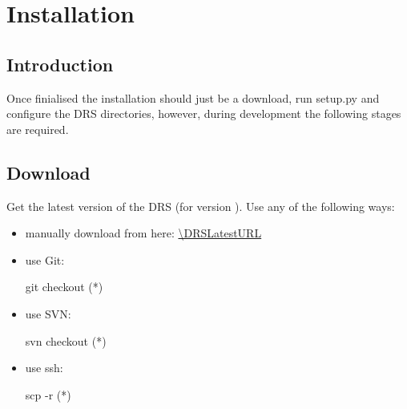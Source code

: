 \chapter{Installation}
\label{chapter:installation}

\section{Introduction}
\label{ch:install:installintro}

Once finialised the installation should just be a download, run setup.py and configure the DRS directories, however, during development the following stages are required.








\section{Download}
\label{ch:install:installDownload}

Get the latest version of the DRS (for \instrument version \MyCodeVersion). Use any of the following ways:

\begin{itemize}
\item manually download from here: \url{\DRSLatestURL}

\item use Git:
\begin{cmdbox}
git checkout (*\DRSGitURL*)
\end{cmdbox}

\item use SVN:
\begin{cmdbox}
svn checkout  (*\DRSGitURL*)
\end{cmdbox}

\item use ssh:
\begin{cmdbox}
scp -r (*\DRSsshURL*)
\end{cmdbox}

\end{itemize}


